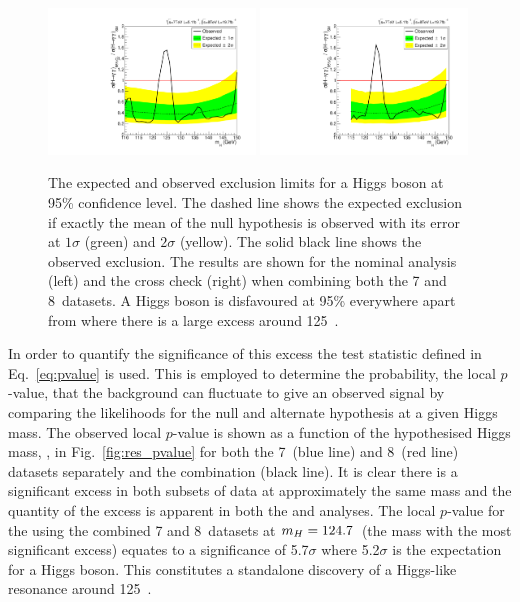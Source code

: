 \begin{figure}
  \includegraphics[width=0.49\textwidth]{results/plots/mva_limit.pdf}
  \includegraphics[width=0.49\textwidth]{results/plots/sideband_limit.pdf}
  \caption[The expected and observed exclusion limits for a \acs{SM} Higgs boson at 95\% confidence level]{The expected and observed exclusion limits for a \SM Higgs boson at 95\% confidence level. The dashed line shows the expected exclusion if exactly the mean of the null hypothesis is observed with its error at $1\sigma$ (green) and $2\sigma$ (yellow). The solid black line shows the observed exclusion. The results are shown for the nominal \MFM analysis (left) and the cross check \SMVA (right) when combining both the 7 and 8~\TeV datasets. A \SM Higgs boson is disfavoured at 95\% everywhere apart from where there is a large excess around 125~\GeV.}
  \label{fig:res_exclusion}
\end{figure}

In order to quantify the significance of this excess the test statistic defined in Eq.~\ref{eq:pvalue} is used. This is employed to determine the probability, the local $p$-value, that the background can fluctuate to give an observed signal by comparing the likelihoods for the null and alternate hypothesis at a given Higgs mass. The observed local $p$-value is shown as a function of the hypothesised Higgs mass, \mH, in Fig.~\ref{fig:res_pvalue} for both the 7~\TeV (blue line) and 8~\TeV (red line) datasets separately and the combination (black line). It is clear there is a significant excess in both subsets of data at approximately the same mass and the quantity of the excess is apparent in both the \MFM and \SMVA analyses. The local $p$-value for the \MFM using the combined 7 and 8~\TeV datasets at $m_{H}=124.7$~\GeV (the mass with the most significant excess) equates to a significance of 5.7$\sigma$ where 5.2$\sigma$ is the expectation for a \SM Higgs boson. This constitutes a standalone discovery of a Higgs-like resonance around 125~\GeV.

